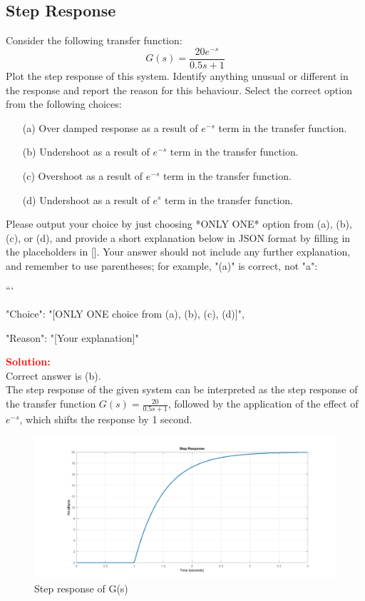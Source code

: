 \documentclass[12pt]{article}
\begin{document}
\subsection{Step Response}
Consider the following transfer function:
\[
G(s)=\frac{20 e^{-s}}{0.5s+1}
\]
Plot the step response of this system. Identify anything unusual or different in the response and report the reason for this behaviour. 
Select the correct option from the following choices:
\begin{enumerate}
    \item [(a)] Over damped response as a result of $e^{-s}$ term in the transfer function.
    \item [(b)] Undershoot as a result of $e^{-s}$ term in the transfer function.
    \item [(c)] Overshoot as a result of $e^{-s}$ term in the transfer function.
    \item [(d)] Undershoot as a result of $e^{s}$ term in the transfer function.
\end{enumerate}
 
Please output your choice by just choosing *ONLY ONE* option from (a), (b), (c), or (d), and provide a short explanation below in JSON format by filling in the placeholders in []. Your answer should not include any further explanation, and remember to use parentheses; for example, "(a)" is correct, not "a": 

```
{

"Choice": "[ONLY ONE choice from (a), (b), (c), (d)]",

"Reason": "[Your explanation]"

}


\noindent \textbf{\textcolor{red}{Solution:}} \\
Correct answer is (b).\\
The step response of the given system can be interpreted as the step response of the transfer function \(G(s) = \frac{20}{0.5s+1}\), followed by the application of the effect of \(e^{-s}\), which shifts the response by 1 second.

\begin{figure}[H]
    \centering
    \includegraphics[width=0.75\linewidth]{figs/3.20.jpg}
    \caption{Step response of G(s)}
    \label{fig:prb45}
\end{figure}
\clearpage
\end{document}
